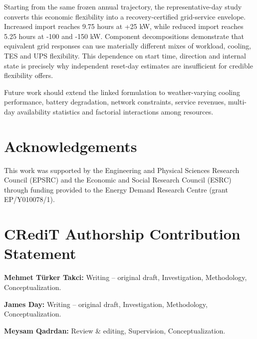 Starting from the same frozen annual trajectory, the representative-day study
converts this economic flexibility into a recovery-certified grid-service
envelope. Increased import reaches 9.75 hours at +25 kW, while reduced import
reaches 5.25 hours at -100 and -150 kW. Component decompositions
demonstrate that equivalent grid responses can use materially different mixes
of workload, cooling, TES and UPS flexibility. This dependence on start time,
direction and internal state is precisely why independent reset-day estimates
are insufficient for credible flexibility offers.

Future work should extend the linked formulation to weather-varying cooling
performance, battery degradation, network constraints, service revenues,
multi-day availability statistics and factorial interactions among resources.




\section*{Acknowledgements}

This work was supported by the Engineering and Physical Sciences Research
Council (EPSRC) and the Economic and Social Research Council (ESRC) through
funding provided to the Energy Demand Research Centre (grant EP/Y010078/1).

\section*{CRediT Authorship Contribution Statement}

\noindent \textbf{Mehmet T{\"u}rker Takci:} Writing -- original draft,
Investigation, Methodology, Conceptualization.

\medskip
\noindent \textbf{James Day:} Writing -- original draft, Investigation,
Methodology, Conceptualization.

\medskip
\noindent \textbf{Meysam Qadrdan:} Review \& editing, Supervision,
Conceptualization.
